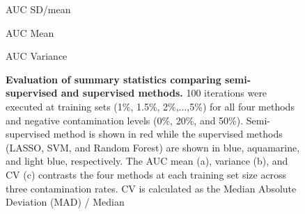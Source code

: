 \documentclass{bmcart}
\def\texttt{[image: ]}
\begin{document}
\begin{backmatter}
\renewcommand{\figurename}{Supplementary Figure}
\setcounter{figure}{0}

\begin{figure}[ht!]
    \centering
        \caption{AUC SD/mean}
        \caption{AUC Mean}
        \caption{AUC Variance}
    \vspace{1cm}
    \caption{\textbf{Evaluation of summary statistics comparing semi-supervised and supervised methods.} 100 iterations were executed at training sets (1\%, 1.5\%, 2\%,...,5\%) for all four methods and negative contamination levels (0\%, 20\%, and 50\%). Semi-supervised method is shown in red while the supervised methods (LASSO, SVM, and Random Forest) are shown in blue, aquamarine, and light blue, respectively. The AUC mean (a), variance (b), and CV (c) contrasts the four methods at each training set size across three contamination rates. CV is calculated as the Median Absolute Deviation (MAD) / Median}
    \label{fig:AUCsummarymean}
\end{figure}



\end{backmatter}
\end{document}
